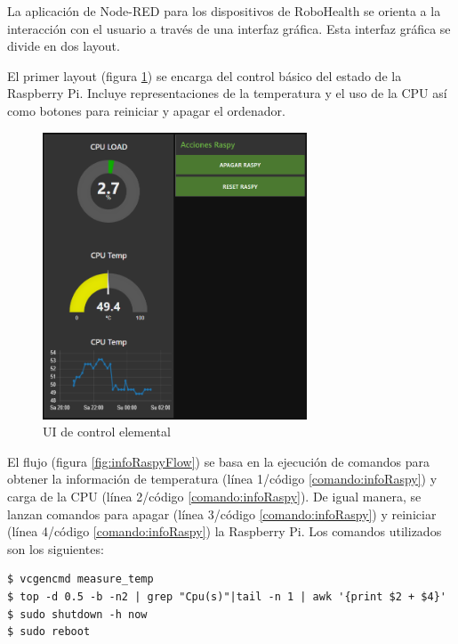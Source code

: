 La aplicación de Node-RED para los dispositivos de RoboHealth se orienta a la interacción con el usuario a través de una interfaz gráfica. Esta interfaz gráfica se divide en dos layout.

El primer layout (figura \ref{fig:infoRaspyDash}) se encarga del control básico del estado de la Raspberry Pi. Incluye representaciones de la temperatura y el uso de la CPU así como botones para reiniciar y apagar el ordenador.

\begin{figure}[H]
\centering
\includegraphics[width=0.7\textwidth]{figuras/infoRaspyDash.png}
\caption{UI de control elemental}
\label{fig:infoRaspyDash}
\end{figure}

El flujo (figura \ref{fig:infoRaspyFlow}) se basa en la ejecución de comandos para obtener la información de temperatura (línea 1/código \ref{comando:infoRaspy}) y carga de la CPU (línea 2/código \ref{comando:infoRaspy}). De igual manera, se lanzan comandos para apagar (línea 3/código \ref{comando:infoRaspy}) y reiniciar (línea 4/código \ref{comando:infoRaspy}) la Raspberry Pi. Los comandos utilizados son los siguientes:


\begin{lstlisting}[frame=single, label=command:ssh, label=comando:infoRaspy]
$ vcgencmd measure_temp
$ top -d 0.5 -b -n2 | grep "Cpu(s)"|tail -n 1 | awk '{print $2 + $4}'
$ sudo shutdown -h now
$ sudo reboot
\end{lstlisting}

